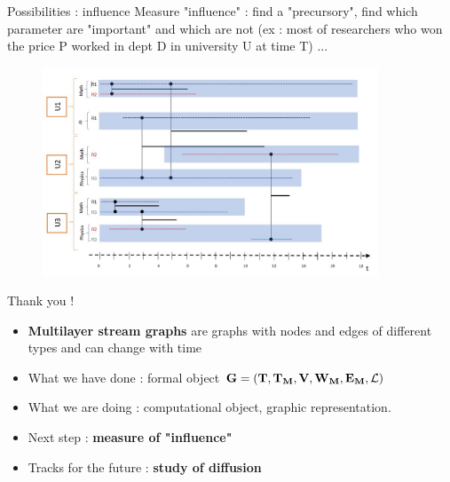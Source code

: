 \documentclass[15pt]{beamer}
\begin{document}
\begin{frame}{Possibilities : influence}%
	Measure "influence" : find a "precursory", find which parameter are "important" and which are not (ex : most of researchers who won the price P worked in dept D in university U at time T) ...
	\begin{figure}
		\centering
		\includegraphics[width=10cm]{img/chercheurs.jpg}
		\label{influ}
	\end{figure}
\end{frame}



\begin{frame}{Thank you !}
	\begin{itemize}
		\item \textbf{Multilayer stream graphs} are graphs with nodes and edges of different types and can change with time
		\item What we have done : formal object $\mathbf{G=(T,T_M,V,W_M,E_M,\cal{L})}$
		\item What we are doing : computational object, graphic representation.
		\item Next step : \textbf{measure of "influence"}
		\item Tracks for the future : \textbf{study of diffusion}
	\end{itemize}
	
\end{frame}
\end{document}
